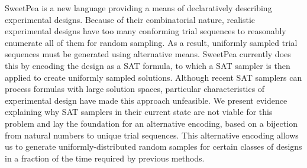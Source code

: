 
SweetPea is a new language providing a means of declaratively describing experimental designs. Because of their combinatorial nature, realistic experimental designs have too many conforming trial sequences to reasonably enumerate all of them for random sampling. As a result, uniformly sampled trial sequences must be generated using alternative means. SweetPea currently does this by encoding the design as a SAT formula, to which a SAT sampler is then applied to create uniformly sampled solutions. Although recent SAT samplers can process formulas with large solution spaces, particular characteristics of experimental design have made this approach unfeasible. We present evidence explaining why SAT samplers in their current state are not viable for this problem and lay the foundation for an alternative encoding, based on a bijection from natural numbers to unique trial sequences. This alternative encoding allows us to generate uniformly-distributed random samples for certain classes of designs in a fraction of the time required by previous methods.